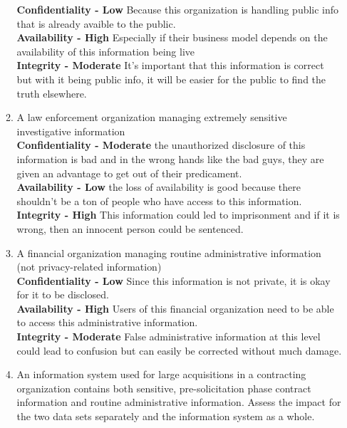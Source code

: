 \documentclass[12pt]{article}
\begin{document}
\begin{enumerate}
\begin{enumerate}
		\textbf{Confidentiality - Low} Because this organization is handling public info that is already avaible to the public.\\
		\textbf{Availability - High} Especially if their business model depends on the availability of this information being live \\
		\textbf{Integrity - Moderate} It's important that this information is correct but with it being public info, it will be easier for the public to find the truth elsewhere. \\

		\item{A law enforcement organization managing extremely sensitive investigative information} \\
		\textbf{Confidentiality - Moderate} the unauthorized disclosure of this information is bad and in the wrong hands like the bad guys, they are given an advantage to get out of their predicament. \\
		\textbf{Availability - Low} the loss of availability is good because there shouldn't be a ton of people who have access to this information. \\
		\textbf{Integrity - High} This information could led to imprisonment and if it is wrong, then an innocent person could be sentenced. \\

		\item{A financial organization managing routine administrative information (not privacy-related information)} \\

		\textbf{Confidentiality - Low} Since this information is not private, it is okay for it to be disclosed. \\
		\textbf{Availability - High} Users of this financial organization need to be able to access this administrative information.\\
		\textbf{Integrity - Moderate} False administrative information at this level could lead to confusion but can easily be corrected without much damage. \\

		\item{An information system used for large acquisitions in a contracting organization contains both sensitive, pre-solicitation phase contract information and routine administrative information. Assess the impact for the two data sets separately and the information system as a whole.} \\


\end{enumerate}
\end{enumerate}
\end{document}
